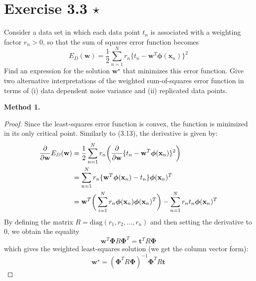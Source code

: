 \section*{Exercise 3.3 $\star$}
Consider a data set in which each data point $t_n$ is associated with a weighting
factor $r_n > 0$, so that the sum of squares error function becomes
\begin{equation}\label{eq:3.104}\tag{3.104}
    E_D(\mathbf{w}) = \frac{1}{2} \sum_{n=1}^{N} 
    r_n\{t_n - \mathbf{w}^T \bm{\phi}(\mathbf{x}_n)\}^2
\end{equation}
Find an expression for the solution $\mathbf{w}^\star$ that minimizes this error function.
Give two alternative interpretations of the weighted sum-of-squares error function
in terms of (i) data dependent noise variance and (ii) replicated data points.

\vspace{1em}

\textbf{Method 1.}

\begin{proof}
    Since the least-squares error function is convex,
    the function is minimized in its only critical 
    point. Similarly to (3.13), the derivative is given by:
    \begin{align*}
        \pdv{\mathbf{w}} E_D(\mathbf{w})
        &= \frac{1}{2} \sum_{n=1}^{N} r_n \bigg(\pdv{\mathbf{w}} 
        \{t_n - \mathbf{w}^T \bm{\phi}(\mathbf{x}_n)\}^2\bigg) \\
        &= \sum_{n=1}^N r_n \{\mathbf{w}^T \bm{\phi}(\mathbf{x}_n) - t_n\} 
        \bm{\phi}(\mathbf{x}_n)^T \\
        &= \mathbf{w}^T 
        \bigg(\sum_{i=1}^{N} r_n \bm{\phi}(\mathbf{x}_n)
        \bm{\phi}(\mathbf{x}_n)^T\bigg) -
        \sum_{n=1}^{N} r_n t_n \bm{\phi}(\mathbf{x}_n)^T
    \end{align*}
    By defining the matrix $R = \text{diag}(r_1, r_2, \ldots, r_n)$
    and then setting the derivative to 0, we obtain the equality
    \[
        \mathbf{w}^T \mathbf{\Phi}R\mathbf{\Phi}^T
        = \mathbf{t}^TR\mathbf{\Phi} 
    \] 
    which gives the weighted least-squares solution (we get the
    column vector form):
    \[
        \mathbf{w}^\star = (\mathbf{\Phi}^TR\mathbf{\Phi})^{-1} \mathbf{\Phi}^T R \mathbf{t} 
    \] 
\end{proof}

